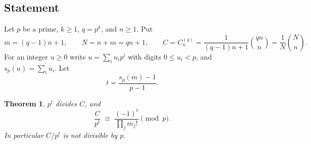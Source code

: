 \documentclass[11pt]{article}
\newtheorem{theorem}{Theorem}[section]
\theoremstyle{definition}
\theoremstyle{remark}
\numberwithin{equation}{section}
\numberwithin{figure}{section}
\newcommand{\refnote}[1]{[\emph{Note added on 15 November after an AI referee's report:} #1]}
\newcommand{\revnote}[1]{[\emph{Added on 15 November after an AI review of the report:} #1]}
\begin{document}
\subsection{Statement}\label{path:sec:statement}

Let $p$ be a prime, $k\ge 1$, $q=p^k$, and $n\ge 1$. Put
\[
m=(q-1)n+1,\qquad N=n+m=qn+1,\qquad
C=C^{(q)}_n=\frac{1}{(q-1)n+1}\binom{qn}{n}=\frac1N\binom Nn .
\]
For an integer $u\ge 0$ write $u=\sum_i u_i p^i$ with digits $0\le u_i<p$, and $s_p(u)=\sum_i u_i$. Let
\[
t=\frac{s_p(m)-1}{p-1}.
\]

\begin{theorem}\label{path:thm:main}
$p^t$ divides $C$, and
\[
\frac{C}{p^t}\;\equiv\;\frac{(-1)^t}{\prod_j m_j!}\pmod p .
\]
In particular $C/p^t$ is not divisible by $p$.
\end{theorem}
\end{document}
